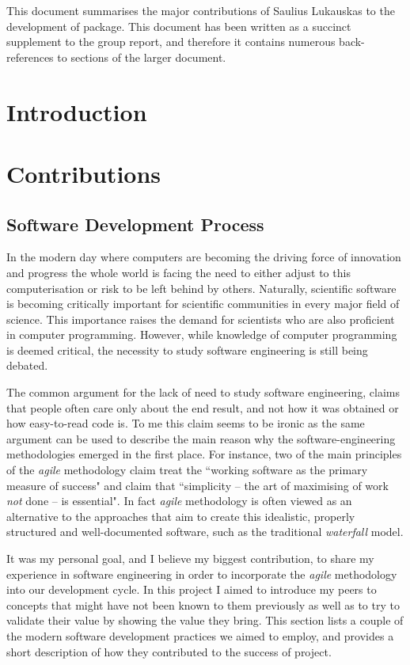 This document summarises the major contributions of Saulius Lukauskas
to the development of \means{} package.
This document has been written as a succinct supplement to the group report, and therefore it contains numerous back-references to sections of the larger document.

\section{Introduction}

\section{Contributions}
\subsection{Software Development Process}
In the modern day where computers are becoming the driving force of innovation and progress the whole world is facing the need to either adjust to this computerisation or risk to be left behind by others.
Naturally, scientific software is becoming critically important for scientific communities in every major field of science. This importance raises the demand for scientists who are also proficient in computer programming. However, while knowledge of computer programming is deemed critical, the necessity to study software engineering is still being debated. 

The common argument for the lack of need to study software engineering, claims that people often care only about the end result, and not how it was obtained or how easy-to-read code is.
To me this claim seems to be ironic as the same argument can be used to describe the main reason why the software-engineering methodologies emerged in the first place. 
For instance, two of the main principles of the \emph{agile} methodology\cite{_manifesto_????} claim treat the ``working software as the primary measure of success" and claim that ``simplicity -- the art of maximising of work \emph{not} done -- is essential"\cite{paulk_agile_2002}. 
In fact \emph{agile} methodology is often viewed as an alternative to the approaches that aim to create this idealistic, properly structured and well-documented software, such as the traditional \emph{waterfall} model.

It was my personal goal, and I believe my biggest contribution, to share my experience in software engineering in order to incorporate the \emph{agile} methodology into our development cycle. 
In this project I aimed to introduce my peers to concepts that might have not been known to them previously as well as to try to validate their value by showing the value they bring. 
This section lists a couple of the modern software development practices we aimed to employ, and provides a short description of how they contributed to the success of \means{} project.

